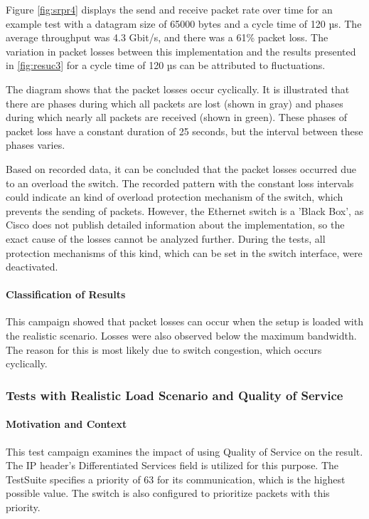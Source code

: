 Figure \ref{fig:srpr4} displays the send and receive packet rate over time for an example test with a datagram size of 65000 bytes and a cycle time of 120 µs. The average throughput was 4.3 Gbit/s, and there was a 61\% packet loss. The variation in packet losses between this implementation and the results presented in \ref{fig:resuc3} for a cycle time of 120 µs can be attributed to fluctuations.

The diagram shows that the packet losses occur cyclically. It is illustrated that there are phases during which all packets are lost (shown in gray) and phases during which nearly all packets are received (shown in green). These phases of packet loss have a constant duration of 25 seconds, but the interval between these phases varies.

Based on recorded data, it can be concluded that the packet losses occurred due to an overload the switch. The recorded pattern with the constant loss intervals could indicate an kind of overload protection mechanism of the switch, which prevents the sending of packets. However, the Ethernet switch is a 'Black Box', as Cisco does not publish detailed information about the implementation, so the exact cause of the losses cannot be analyzed further. During the tests, all protection mechanisms of this kind, which can be set in the switch interface, were deactivated.

\paragraph{Classification of Results}
This campaign showed that packet losses can occur when the setup is loaded with the realistic scenario. Losses were also observed below the maximum bandwidth. The reason for this is most likely due to switch congestion, which occurs cyclically.

\subsubsection{Tests with Realistic Load Scenario and Quality of Service}
\paragraph{Motivation and Context}
This test campaign examines the impact of using Quality of Service on the result. The IP header's Differentiated Services field is utilized for this purpose. The TestSuite specifies a priority of 63 for its communication, which is the highest possible value. The switch is also configured to prioritize packets with this priority.

